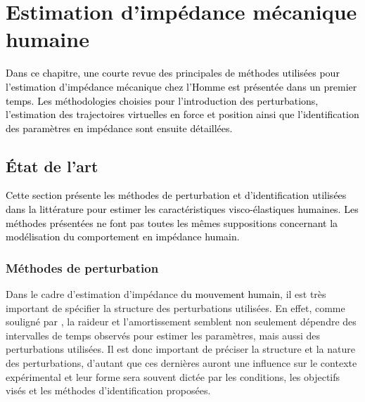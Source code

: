 \chapter{Estimation d’impédance mécanique humaine} \label{chap3}
\minitoc

\textcolor{black}{Dans ce chapitre, une courte revue des principales de méthodes utilisées pour l'estimation d'impédance mécanique chez l'Homme est présentée dans un premier temps. Les méthodologies choisies pour l'introduction des perturbations, l'estimation des trajectoires virtuelles en force et position ainsi que l'identification des paramètres en impédance sont ensuite détaillées.}

\section{État de l'art}

\textcolor{black}{Cette section présente les méthodes de perturbation et  d'identification utilisées dans la littérature pour estimer les caractéristiques visco-élastiques humaines. Les méthodes présentées ne font pas toutes les mêmes suppositions concernant la modélisation du comportement en impédance humain.}

\subsection{Méthodes de perturbation} \label{chap3_sec_st_art_sub_pert}



Dans le cadre d'estimation d'impédance \textcolor{black}{du mouvement humain}, il est très important de spécifier la structure des perturbations utilisées. En effet, comme souligné par \textcite{kistemaker_vivo_2011}, la raideur et l'amortissement semblent non seulement dépendre des intervalles de temps observés pour estimer les paramètres, mais aussi des perturbations utilisées. Il est donc important de préciser la structure et la nature des perturbations, d'autant que ces dernières auront une influence sur le contexte expérimental et leur forme sera souvent dictée par les conditions, les objectifs visés et les méthodes d'identification proposées.


